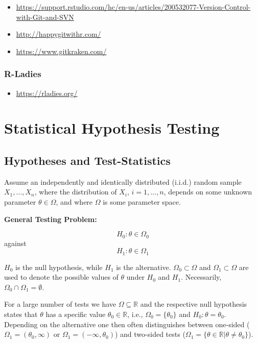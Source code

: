 \documentclass[]{book}
\providecommand{\tightlist}{%
  \setlength{\itemsep}{0pt}\setlength{\parskip}{0pt}}
\theoremstyle{definition}
\theoremstyle{definition}
\theoremstyle{definition}
\theoremstyle{remark}
\begin{document}
\begin{itemize}
\item
  \url{https://support.rstudio.com/hc/en-us/articles/200532077-Version-Control-with-Git-and-SVN}
\item
  \url{http://happygitwithr.com/}
\item
  \url{https://www.gitkraken.com/}
\end{itemize}

\hypertarget{r-ladies}{%
\subsection{R-Ladies}\label{r-ladies}}

\begin{itemize}
\tightlist
\item
  \url{https://rladies.org/}
\end{itemize}

\hypertarget{statistical-hypothesis-testing}{%
\chapter{Statistical Hypothesis Testing}\label{statistical-hypothesis-testing}}

\hypertarget{hypotheses-and-test-statistics}{%
\section{Hypotheses and Test-Statistics}\label{hypotheses-and-test-statistics}}

Assume an independently and identically distributed (i.i.d.) random sample \(X_1,\dots,X_n\), where the distribution of \(X_i\), \(i=1,\dots,n\), depends on some unknown parameter \(\theta\in\Omega\), and where \(\Omega\) is some parameter space.

\textbf{General Testing Problem:}

\[H_0:\theta\in\Omega_0\]
against
\[H_1:\theta\in\Omega_1\]

\(H_0\) is the null hypothesis, while \(H_1\) is the alternative. \(\Omega_0\subset\Omega\) and \(\Omega_1\subset\Omega\) are used to denote the possible values of \(\theta\) under \(H_0\) and \(H_1\). Necessarily, \(\Omega_0\cap\Omega_1=\emptyset\).

For a large number of tests we have \(\Omega\subseteq\mathbb{R}\) and the respective null hypothesis states that \(\theta\) has a specific value \(\theta_0\in\mathbb{R}\), i.e., \(\Omega_0=\{\theta_0\}\) and \(H_0:\theta=\theta_0\). Depending on the alternative one then often distinguishes between one-sided (\(\Omega_1=(\theta_0,\infty)\) or \(\Omega_1=(-\infty,\theta_0)\)) and two-sided tests (\(\Omega_1=\{\theta\in\mathbb{R}|\theta\neq \theta_0\}\)).
\end{document}
